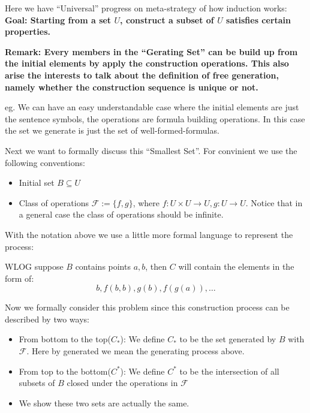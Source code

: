 \documentclass[11pt]{article}
\begin{document}
Here we have ``Universal'' progress on meta-strategy of how induction works:
\textbf{Goal: Starting from a set \(U\), construct a subset of \(U\) satisfies certain properties.}

\begin{center}\end{center}

\textbf{Remark: Every members in the ``Gerating Set'' can be build up from the initial elements by apply the construction operations. This also arise the interests to talk about the definition of free generation, namely whether the construction sequence is unique or not.}

eg. We can have an easy understandable case where the initial elements are just the sentence symbols, the operations are formula building operations. In this case the set we generate is just the set of well-formed-formulas.

Next we want to formally discuss this ``Smallest Set''. For convinient we use the following conventions:
\begin{itemize}
\item Initial set \(B \subseteq U\)
\item Class of operations \(\mathcal{F}:=\{f,g\}\), where \(f:U \times U \to U, g: U \to U\).
Notice that in a general case the class of operations should be infinite.
\end{itemize}

With the notation above we use a little more formal language to represent the process:

WLOG suppose \(B\) contains points \(a,b\), then \(C\) will contain the elements in the form of:
  \[
  b, f(b,b), g(b), f(g(a)), \dots
  \]

Now we formally consider this problem since this construction process can be described by two ways:
\begin{itemize}
\item From bottom to the top(\(C_{\ast}\)): We define \(C_{\ast}\) to be the set generated by \(B\) with \(\mathcal{F}\). Here by generated we mean the generating process above.

\item From top to the bottom(\(C^{\ast}\)):
We define \(C^{\ast}\) to be the intersection of all subsets of \(B\) closed under the operations in \(\mathcal{F}\)

\item We show these two sets are actually the same.
\end{itemize}
\end{document}
